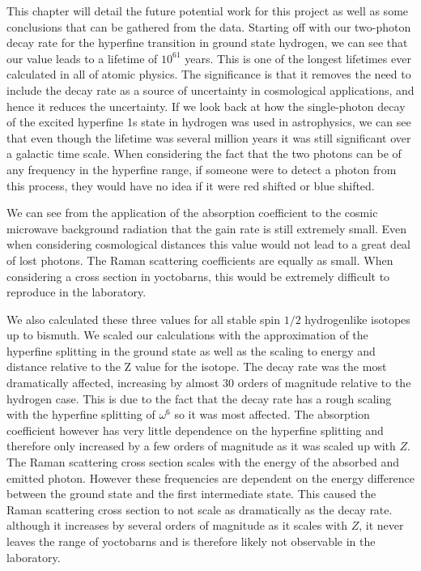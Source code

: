 This chapter will detail the future potential work for this project as well as some conclusions that can be gathered from the data. Starting off with our two-photon decay rate for the hyperfine transition in ground state hydrogen, we can see that our value leads to a lifetime of $10^{61}$ years. This is one of the longest lifetimes ever calculated in all of atomic physics. The significance is that it removes the need to include the decay rate as a source of uncertainty in cosmological applications, and hence it reduces the uncertainty. If we look back at how the single-photon decay of the excited hyperfine 1s state in hydrogen was used in astrophysics, we can see that even though the lifetime was several million years it was still significant over a galactic time scale. When considering the fact that the two photons can be of any frequency in the hyperfine range, if someone were to detect a photon from this process, they would have no idea if it were red shifted or blue shifted. 

We can see from the application of the absorption coefficient to the cosmic microwave background radiation that the gain rate is still extremely small. Even when considering cosmological distances this value would not lead to a great deal of lost photons. The Raman scattering coefficients are equally as small. When considering a cross section in yoctobarns, this would be extremely difficult to reproduce in the laboratory.

We also calculated these three values for all stable spin $1/2$ hydrogenlike isotopes up to bismuth. We scaled our calculations with the approximation of the hyperfine splitting in the ground state as well as the scaling to energy and distance relative to the Z value for the isotope. The decay rate was the most dramatically affected, increasing by almost 30 orders of magnitude relative to the hydrogen case. This is due to the fact that the decay rate has a rough scaling with the hyperfine splitting of $\omega^6$ so it was most affected. The absorption coefficient however has very little dependence on the hyperfine splitting and therefore only increased by a few orders of magnitude as it was scaled up with $Z$. The Raman scattering cross section scales with the energy of the absorbed and emitted photon. However these frequencies are dependent on the energy difference between the ground state and the first intermediate state. This caused the Raman scattering cross section to not scale as dramatically as the decay rate. although it increases by several orders of magnitude as it scales with $Z$, it never leaves the range of yoctobarns and is therefore likely not observable in the laboratory.

